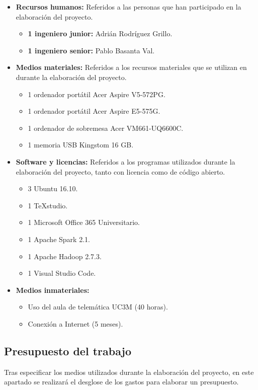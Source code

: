 \begin{itemize}
\item \textbf{Recursos humanos:} Referidos a las personas que han participado en la elaboración del proyecto.
\begin{itemize}
\item \textbf{1 ingeniero junior:} Adrián Rodríguez Grillo.
\item \textbf{1 ingeniero senior:} Pablo Basanta Val.
\end{itemize}

\item \textbf{Medios materiales:} Referidos a los recursos materiales que se utilizan en durante la elaboración del proyecto.
\begin{itemize}
\item 1 ordenador portátil Acer Aspire V5-572PG.
\item 1 ordenador portátil Acer Aspire E5-575G.
\item 1 ordenador de sobremesa Acer VM661-UQ6600C.
\item 1 memoria \gls{USB} Kingstom 16 GB.
\end{itemize}

\clearpage
\item \textbf{Software y licencias:} Referidos a los programas utilizados durante la elaboración del proyecto, tanto con licencia como de código abierto.
\begin{itemize}
\item 3 Ubuntu 16.10.
\item 1 TeXstudio.
\item 1 Microsoft Office 365 Universitario.
\item 1 Apache Spark 2.1.
\item 1 Apache Hadoop 2.7.3.
\item 1 Visual Studio Code.
\end{itemize}

\item \textbf{Medios inmateriales:}
\begin{itemize}
\item Uso del aula de telemática UC3M (40 horas).
\item Conexión a Internet (5 meses).
\end{itemize}
\end{itemize}

\subsection{Presupuesto del trabajo}
Tras especificar los medios utilizados durante la elaboración del proyecto, en este apartado se realizará el desglose de los gastos para elaborar un presupuesto.


